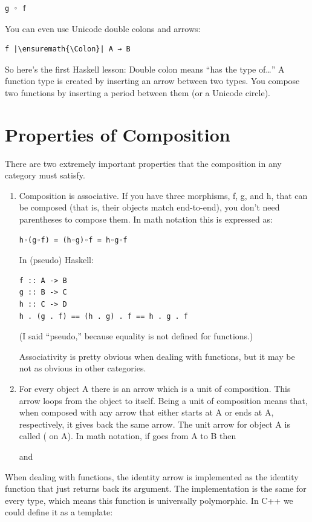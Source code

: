 \begin{Verbatim}[commandchars=\\\{\}]
g ◦ f
\end{Verbatim}
You can even use Unicode double colons and arrows:

\begin{verbatim}
f |\ensuremath{\Colon}| A → B
\end{verbatim}
So here's the first Haskell lesson: Double colon means ``has the type
of\ldots{}'' A function type is created by inserting an arrow between
two types. You compose two functions by inserting a period between them
(or a Unicode circle).

\section{Properties of Composition}\label{properties-of-composition}

There are two extremely important properties that the composition in any
category must satisfy.

\begin{enumerate}
\item
Composition is associative. If you have three morphisms, f, g, and h,
that can be composed (that is, their objects match end-to-end), you
don't need parentheses to compose them. In math notation this is
expressed as:

\begin{Verbatim}[commandchars=\\\{\}]
h◦(g◦f) = (h◦g)◦f = h◦g◦f
\end{Verbatim}
In (pseudo) Haskell:

\begin{Verbatim}[commandchars=\\\{\}]
f :: A -> B
g :: B -> C
h :: C -> D
h . (g . f) == (h . g) . f == h . g . f
\end{Verbatim}
(I said ``pseudo,'' because equality is not defined for functions.)

Associativity is pretty obvious when dealing with functions, but it may
be not as obvious in other categories.

\item
For every object A there is an arrow which is a unit of composition.
This arrow loops from the object to itself. Being a unit of composition
means that, when composed with any arrow that either starts at A or ends
at A, respectively, it gives back the same arrow. The unit arrow for
object A is called  ( on A). In math
notation, if  goes from A to B then


and

\end{enumerate}
When dealing with functions, the identity arrow is implemented as the
identity function that just returns back its argument. The
implementation is the same for every type, which means this function is
universally polymorphic. In C++ we could define it as a template:

